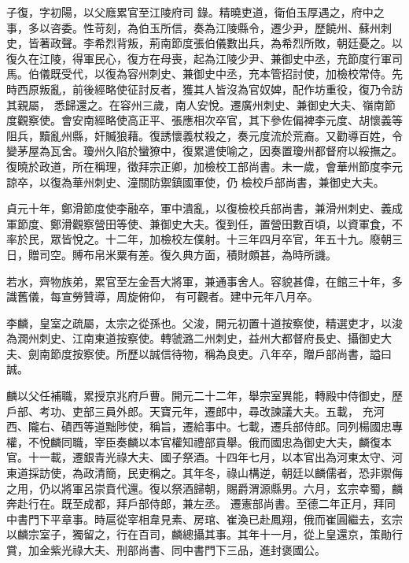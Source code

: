\begin{pinyinscope}
 子復，字初陽，以父廕累官至江陵府司
 錄。精曉吏道，衛伯玉厚遇之，府中之事，多以咨委。性苛刻，為伯玉所信，奏為江陵縣令，遷少尹，歷饒州、蘇州刺史，皆著政聲。李希烈背叛，荊南節度張伯儀數出兵，為希烈所敗，朝廷憂之。以復久在江陵，得軍民心，復方在母喪，起為江陵少尹、兼御史中丞，充節度行軍司馬。伯儀既受代，以復為容州刺史、兼御史中丞，充本管招討使，加檢校常侍。先時西原叛亂，前後經略使征討反者，獲其人皆沒為官奴婢，配作坊重役，復乃令訪其親屬，
 悉歸還之。在容州三歲，南人安悅。遷廣州刺史、兼御史大夫、嶺南節度觀察使。會安南經略使高正平、張應相次卒官，其下參佐偏裨李元度、胡懷義等阻兵，黷亂州縣，奸贓狼藉。復誘懷義杖殺之，奏元度流於荒裔。又勸導百姓，令變茅屋為瓦舍。瓊州久陷於蠻獠中，復累遣使喻之，因奏置瓊州都督府以綏撫之。復曉於政道，所在稱理，徵拜宗正卿，加檢校工部尚書。未一歲，會華州節度李元諒卒，以復為華州刺史、潼關防禦鎮國軍使，仍
 檢校戶部尚書，兼御史大夫。



 貞元十年，鄭滑節度使李融卒，軍中潰亂，以復檢校兵部尚書，兼滑州刺史、義成軍節度、鄭滑觀察營田等使、兼御史大夫。復到任，置營田數百頃，以資軍食，不率於民，眾皆悅之。十二年，加檢校左僕射。十三年四月卒官，年五十九。廢朝三日，贈司空。賻布帛米粟有差。復久典方面，積財頗甚，為時所譏。



 若水，齊物族弟，累官至左金吾大將軍，兼通事舍人。容貌甚偉，在館三十年，多識舊儀，每宣勞贊導，周旋俯仰，
 有可觀者。建中元年八月卒。



 李麟，皇室之疏屬，太宗之從孫也。父浚，開元初置十道按察使，精選吏才，以浚為潤州刺史、江南東道按察使。轉虢潞二州刺史，益州大都督府長史、攝御史大夫、劍南節度按察使。所歷以誠信待物，稱為良吏。八年卒，贈戶部尚書，謚曰誠。



 麟以父任補職，累授京兆府戶曹。開元二十二年，舉宗室異能，轉殿中侍御史，歷戶部、考功、吏部三員外郎。天寶元年，遷郎中，尋改諫議大夫。五載，
 充河西、隴右、磧西等道黜陟使，稱旨，遷給事中。七載，遷兵部侍郎。同列楊國忠專權，不悅麟同職，宰臣奏麟以本官權知禮部貢舉。俄而國忠為御史大夫，麟復本官。十一載，遷銀青光祿大夫、國子祭酒。十四年七月，以本官出為河東太守、河東道採訪使，為政清簡，民吏稱之。其年冬，祿山構逆，朝廷以麟儒者，恐非禦侮之用，仍以將軍呂崇賁代還。復以祭酒歸朝，賜爵渭源縣男。六月，玄宗幸蜀，麟奔赴行在。既至成都，拜戶部侍郎，兼左丞。
 遷憲部尚書。至德二年正月，拜同中書門下平章事。時扈從宰相韋見素、房琯、崔渙已赴鳳翔，俄而崔圓繼去，玄宗以麟宗室子，獨留之，行在百司，麟總攝其事。其年十一月，從上皇還京，策勛行賞，加金紫光祿大夫、刑部尚書、同中書門下三品，進封褒國公。




\end{pinyinscope}
